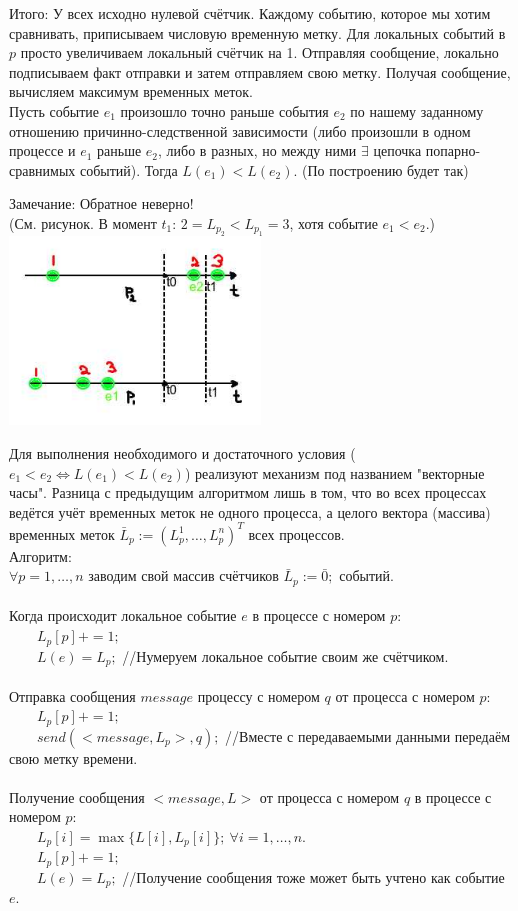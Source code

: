 Итого: У всех исходно нулевой счётчик. Каждому событию, которое мы хотим сравнивать, приписываем числовую временную метку. Для локальных событий в $p$ просто увеличиваем локальный счётчик на 1. Отправляя сообщение, локально подписываем факт отправки и затем отправляем свою метку. Получая сообщение, вычисляем максимум временных меток.\\

Пусть событие $e_1$ произошло точно раньше события $e_2$ по нашему заданному отношению причинно-следственной зависимости (либо произошли в одном процессе и $e_1$ раньше $e_2$, либо в разных, но между ними $\exists$ цепочка попарно-сравнимых событий).
Тогда $L(e_1) < L(e_2)$. (По построению будет так)

Замечание: Обратное неверно! \\
(См. рисунок. В момент $t_1$: $2 = L_{p_2} < L_{p_1} = 3$, хотя событие $e_1 < e_2$.)\\
        \includegraphics[width=0.5\textwidth]{20/Comparison_for_labels.jpg}
        
Для выполнения необходимого и достаточного условия ($e_1 < e_2 \Leftrightarrow L(e_1) < L(e_2)$) реализуют механизм под названием "векторные часы". Разница с предыдущим алгоритмом лишь в том, что во всех процессах ведётся учёт временных меток не одного процесса, а целого вектора (массива) временных меток $\bar{L}_p := (L_p^1, \ldots, L_p^n)^T$ всех процессов.\\
Алгоритм:\\
$\forall p = 1, \ldots, n$ заводим свой массив счётчиков $\bar{L}_p := \bar{0};$ событий.\\ \\
Когда происходит локальное событие $e$ в процессе с номером $p$:\\
\ \ \ \ $L_p[p] += 1;$\\
\ \ \ \ $L(e) = L_p;$ //Нумеруем локальное событие своим же счётчиком. \\ \\
Отправка сообщения $message$ процессу с номером $q$ от процесса с номером $p$:\\
\ \ \ \ $L_p[p] += 1;$\\
\ \ \ \ $send(<message, L_p>, q);$ //Вместе с передаваемыми данными передаём свою метку времени.\\ \\
Получение сообщения $<message, L>$ от процесса с номером $q$ в  процессе с номером $p$:\\
\ \ \ \ $L_p[i] = \max\{L[i],L_p[i]\};\ \forall i = 1, \ldots, n.$\\
\ \ \ \ $L_p[p] += 1;$\\
\ \ \ \ $L(e) = L_p;$ //Получение сообщения тоже может быть учтено как событие $e$.\\

